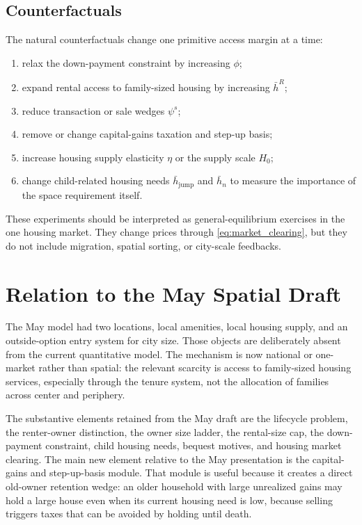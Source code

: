 \documentclass[11pt]{article}
\begin{document}
\subsection{Counterfactuals}

The natural counterfactuals change one primitive access margin at a time:
\begin{enumerate}[leftmargin=*]
    \item relax the down-payment constraint by increasing $\phi$;
    \item expand rental access to family-sized housing by increasing $\bar h^R$;
    \item reduce transaction or sale wedges $\psi^s$;
    \item remove or change capital-gains taxation and step-up basis;
    \item increase housing supply elasticity $\eta$ or the supply scale $H_0$;
    \item change child-related housing needs $\bar h_{\mathrm{jump}}$ and
    $\bar h_n$ to measure the importance of the space requirement itself.
\end{enumerate}

These experiments should be interpreted as general-equilibrium exercises in the
one housing market. They change prices through \eqref{eq:market_clearing}, but
they do not include migration, spatial sorting, or city-scale feedbacks.

\section{Relation to the May Spatial Draft}

The May model had two locations, local amenities, local housing supply, and an
outside-option entry system for city size. Those objects are deliberately absent
from the current quantitative model. The mechanism is now national or
one-market rather than spatial: the relevant scarcity is access to family-sized
housing services, especially through the tenure system, not the allocation of
families across center and periphery.

The substantive elements retained from the May draft are the lifecycle problem,
the renter-owner distinction, the owner size ladder, the rental-size cap, the
down-payment constraint, child housing needs, bequest motives, and housing
market clearing. The main new element relative to the May presentation is the
capital-gains and step-up-basis module. That module is useful because it creates
a direct old-owner retention wedge: an older household with large unrealized
gains may hold a large house even when its current housing need is low, because
selling triggers taxes that can be avoided by holding until death.
\end{document}
